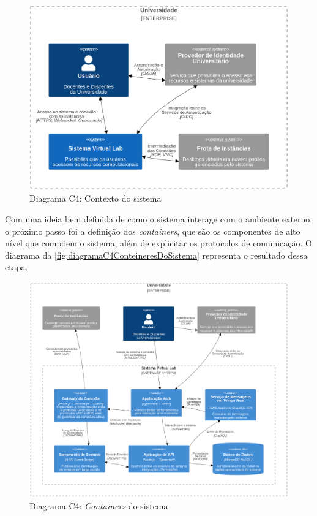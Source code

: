 \begin{figure}[H]
\caption{Diagrama C4: Contexto do sistema}
\label{fig:diagramaC4ContextoDoSistema}
\includegraphics[width=\textwidth]{capitulos/2-metodologia/files/c4-system-context.png}
\end{figure}

Com uma ideia bem definida de como o sistema interage com o ambiente externo, o próximo passo foi a definição dos \textit{containers}, que são os componentes de alto nível que compõem o sistema, além de explicitar os protocolos de comunicação. O diagrama da \autoref{fig:diagramaC4ConteineresDoSistema} representa o resultado dessa etapa.

\begin{figure}[H]
\caption{Diagrama C4: \textit{Containers} do sistema}
\label{fig:diagramaC4ConteineresDoSistema}
\includegraphics[width=\textwidth]{capitulos/2-metodologia/files/c4-container.png}
\end{figure}

